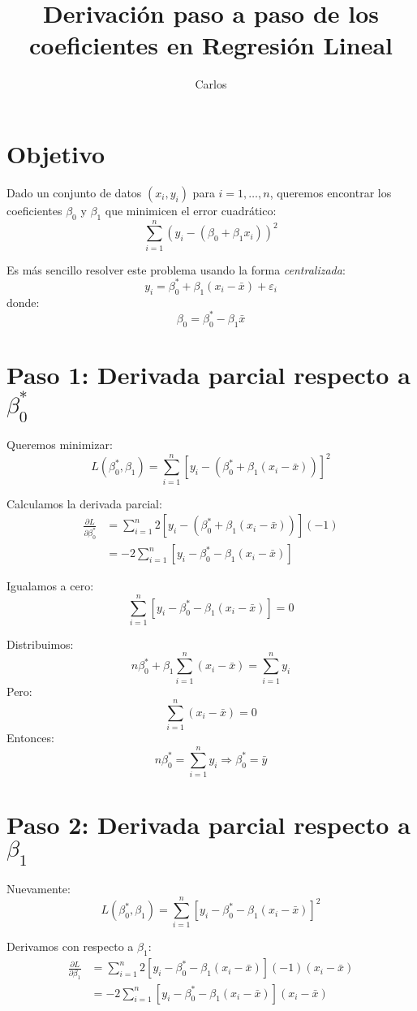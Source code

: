\documentclass[12pt]{article}
\title{Derivaci\'on paso a paso de los coeficientes en Regresi\'on Lineal}
\author{Carlos}
\date{}
\begin{document}
\maketitle

\section*{Objetivo}
Dado un conjunto de datos $(x_i, y_i)$ para $i = 1, \dots, n$, queremos encontrar los coeficientes $\beta_0$ y $\beta_1$ que minimicen el error cuadr\'atico:
\[
\sum_{i=1}^{n} (y_i - (\beta_0 + \beta_1 x_i))^2
\]

Es m\'as sencillo resolver este problema usando la forma \emph{centralizada}:
\[
y_i = \beta_0^* + \beta_1(x_i - \bar{x}) + \varepsilon_i
\]
donde:
\[
\beta_0 = \beta_0^* - \beta_1 \bar{x}
\]

\section*{Paso 1: Derivada parcial respecto a \( \beta_0^* \)}
Queremos minimizar:
\[
L(\beta_0^*, \beta_1) = \sum_{i=1}^{n} [y_i - (\beta_0^* + \beta_1(x_i - \bar{x}))]^2
\]

Calculamos la derivada parcial:
\begin{align*}
\frac{\partial L}{\partial \beta_0^*} &= \sum_{i=1}^{n} 2[y_i - (\beta_0^* + \beta_1(x_i - \bar{x}))](-1) \\
&= -2 \sum_{i=1}^{n} [y_i - \beta_0^* - \beta_1(x_i - \bar{x})]
\end{align*}

Igualamos a cero:
\[
\sum_{i=1}^{n} [y_i - \beta_0^* - \beta_1(x_i - \bar{x})] = 0
\]

Distribuimos:
\[
n \beta_0^* + \beta_1 \sum_{i=1}^{n}(x_i - \bar{x}) = \sum_{i=1}^{n} y_i
\]
Pero:
\[
\sum_{i=1}^{n}(x_i - \bar{x}) = 0
\]
Entonces:
\[
n \beta_0^* = \sum_{i=1}^{n} y_i \Rightarrow \beta_0^* = \bar{y}
\]

\section*{Paso 2: Derivada parcial respecto a \( \beta_1 \)}
Nuevamente:
\[
L(\beta_0^*, \beta_1) = \sum_{i=1}^{n} [y_i - \beta_0^* - \beta_1(x_i - \bar{x})]^2
\]

Derivamos con respecto a $\beta_1$:
\begin{align*}
\frac{\partial L}{\partial \beta_1} &= \sum_{i=1}^{n} 2[y_i - \beta_0^* - \beta_1(x_i - \bar{x})](-1)(x_i - \bar{x}) \\
&= -2 \sum_{i=1}^{n} [y_i - \beta_0^* - \beta_1(x_i - \bar{x})](x_i - \bar{x})
\end{align*}
\end{document}
